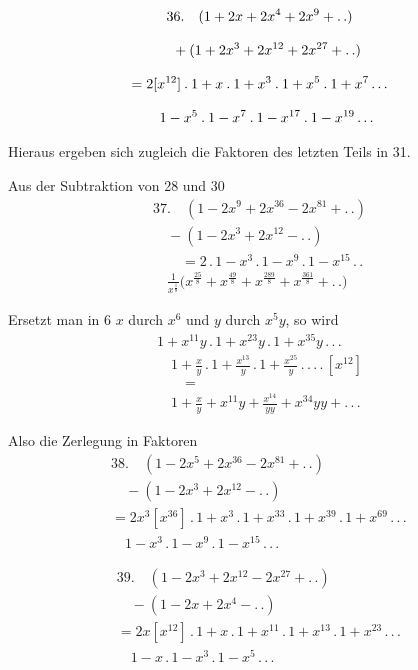 \[
\begin{gathered}
36.\quad (1+2x+2x^{4}+2x^{9}+\mathinner{.\,.})\\[8pt]\quad{}+(1+2x^{3}+2x^{12}+2x^{27}+\mathinner{.\,.})\\[8pt]
 =2[x^{12}]\mathbin{.}1+x\mathbin{.}1+x^{3}\mathbin{.}1+x^{5}\mathbin{.}1+x^{7}\mathinner{.\,.\,.}\\[8pt]\quad{}
 1-x^{5}\mathbin{.}1-x^{7}\mathbin{.}1-x^{17}\mathbin{.}1-x^{19}\mathinner{.\,.\,.}
\end{gathered}
\]


Hieraus ergeben sich zugleich die Faktoren des letzten Teils in 31.


Aus der Subtraktion von 28 und 30
\[
\begin{gathered}
37.\quad (1-2x^9+2x^{36}-2x^{81}+ .\,.)\\[8pt]\quad{}-(1-2x^3+2x^{12}- .\,.)\\[8pt]
\qquad=2\,.\,1-x^3\,.\,1-x^9\,.\,1-x^{15}\,.\,.\,
\\[8pt]\quad{}\frac{1}{x^{\frac18}}\bigl(x^{\frac{25}{8}}+x^{\frac{49}{8}}+x^{\frac{289}{8}}+x^{\frac{361}{8}}+ .\,.\bigr)
\end{gathered}
\]

Ersetzt man in 6 $x$ durch $x^6$ und $y$ durch $x^5y$, so wird
\[
\begin{gathered}
1+x^{11}y\,.\,1+x^{23}y\,.\,1+x^{35}y\,.\,.\,.\,
\\[8pt]\quad{}1+\frac{x}{y}\,.\,1+\frac{x^{13}}{y}\,.\,1+\frac{x^{25}}{y}\,.\,.\,.\,.\,[x^{12}]\\[8pt]
\qquad=\\[8pt]\quad{}1+\frac{x}{y}+x^{11}y+\frac{x^{14}}{yy}+x^{34}yy+ .\,.\,.
\end{gathered}
\]

Also die Zerlegung in Faktoren
\[
\begin{gathered}
38.\quad (1-2x^5+2x^{36}-2x^{81}+ .\,.)\\[8pt]\quad{}-(1-2x^3+2x^{12}- .\,.)\\[8pt]
=2x^3[x^{36}]\,.\,1+x^3\,.\,1+x^{33}\,.\,1+x^{39}\,.\,1+x^{69}\,.\,.\,.\,\\[8pt]\quad{}
1-x^3\,.\,1-x^9\,.\,1-x^{15}\,.\,.\,.
\end{gathered}
\]

\[
\begin{gathered}
39.\quad (1-2x^3+2x^{12}-2x^{27}+ .\,.)\\[8pt]\quad{}-(1-2x+2x^4- .\,.)\\[8pt]
=2x[x^{12}]\,.\,1+x\,.\,1+x^{11}\,.\,1+x^{13}\,.\,1+x^{23}\,.\,.\,.\,\\[8pt]\quad{}
1-x\,.\,1-x^3\,.\,1-x^5\,.\,.\,.
\end{gathered}
\]

